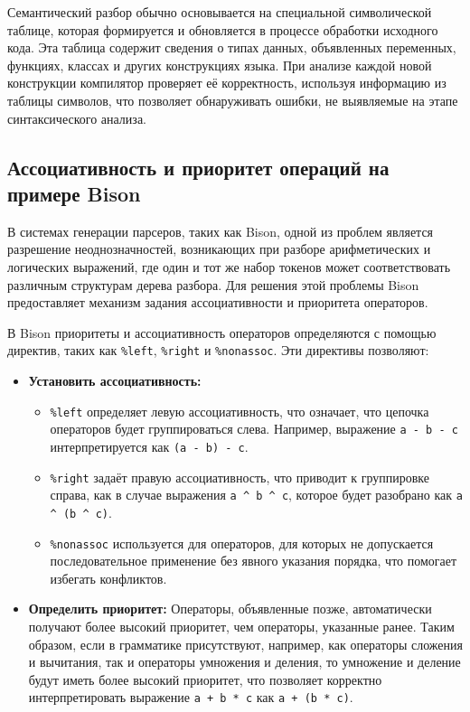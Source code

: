\documentclass[14pt, russian]{scrartcl}
\begin{document}
Семантический разбор обычно основывается на специальной символической таблице, которая формируется и
обновляется в процессе обработки исходного кода. Эта таблица содержит сведения о типах данных,
объявленных переменных, функциях, классах и других конструкциях языка. При анализе каждой новой
конструкции компилятор проверяет её корректность, используя информацию из таблицы символов, что
позволяет обнаруживать ошибки, не выявляемые на этапе синтаксического анализа.

\subsection{Ассоциативность и приоритет операций на примере Bison}

В системах генерации парсеров, таких как Bison, одной из проблем является разрешение неоднозначностей,
возникающих при разборе арифметических и логических выражений, где один и тот же набор токенов может
соответствовать различным структурам дерева разбора. Для решения этой проблемы Bison предоставляет механизм
задания ассоциативности и приоритета операторов.

В Bison приоритеты и ассоциативность операторов определяются с помощью директив, таких как
\verb|%left|, \verb|%right| и \verb|%nonassoc|. Эти директивы позволяют:

\begin{itemize}
	\item \textbf{Установить ассоциативность:}
	\begin{itemize}
		 \item \verb|%left| определяет левую ассоциативность, что означает, что цепочка операторов будет
		 группироваться слева. Например, выражение \verb|a - b - c| интерпретируется как \verb|(a - b) - c|.
		 \item \verb|%right| задаёт правую ассоциативность, что приводит к группировке справа, как в случае
		 выражения \verb|a ^ b ^ c|, которое будет разобрано как \verb|a ^ (b ^ c)|.
		 \item \verb|%nonassoc| используется для операторов, для которых не допускается последовательное
		 применение без явного указания порядка, что помогает избегать конфликтов.
	\end{itemize}
	\item \textbf{Определить приоритет:} Операторы, объявленные позже, автоматически получают более высокий
	приоритет, чем операторы, указанные ранее. Таким образом, если в грамматике присутствуют, например,
	как операторы сложения и вычитания, так и операторы умножения и деления, то умножение и деление будут
	иметь более высокий приоритет, что позволяет корректно интерпретировать выражение \verb|a + b * c| как
	\verb|a + (b * c)|.

\end{itemize}
\end{document}
